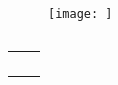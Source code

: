 \documentclass[a4paper,fleqn]{cas-sc}
\begin{document}

\begin{figure}[<options>]
	\centering
		\texttt{[image: ]}
	  \caption{}\label{fig1}
\end{figure}


\begin{table}[<options>]
\caption{}\label{tbl1}
\begin{tabular*}{\tblwidth}{@{}LL@{}}
\toprule
  &  \\ %
\midrule
 & \\
 & \\
 & \\
 & \\
\bottomrule
\end{tabular*}
\end{table}




\section{}\label{}

\printcredits

%




\bio{}
\endbio

\endbio
\end{document}
